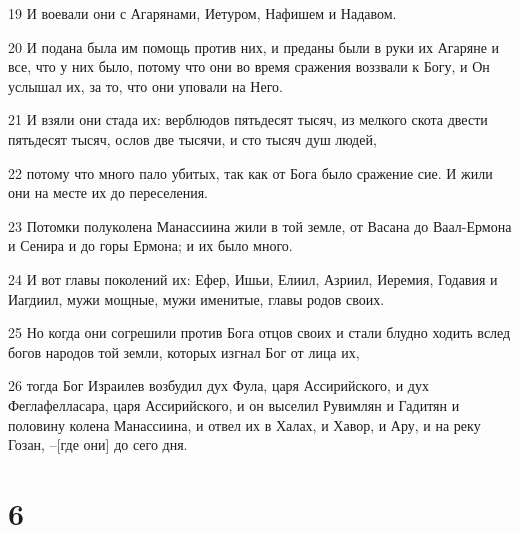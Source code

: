 \par 19 И воевали они с Агарянами, Иетуром, Нафишем и Надавом.
\par 20 И подана была им помощь против них, и преданы были в руки их Агаряне и все, что у них было, потому что они во время сражения воззвали к Богу, и Он услышал их, за то, что они уповали на Него.
\par 21 И взяли они стада их: верблюдов пятьдесят тысяч, из мелкого скота двести пятьдесят тысяч, ослов две тысячи, и сто тысяч душ людей,
\par 22 потому что много пало убитых, так как от Бога было сражение сие. И жили они на месте их до переселения.
\par 23 Потомки полуколена Манассиина жили в той земле, от Васана до Ваал-Ермона и Сенира и до горы Ермона; и их было много.
\par 24 И вот главы поколений их: Ефер, Ишьи, Елиил, Азриил, Иеремия, Годавия и Иагдиил, мужи мощные, мужи именитые, главы родов своих.
\par 25 Но когда они согрешили против Бога отцов своих и стали блудно ходить вслед богов народов той земли, которых изгнал Бог от лица их,
\par 26 тогда Бог Израилев возбудил дух Фула, царя Ассирийского, и дух Феглафелласара, царя Ассирийского, и он выселил Рувимлян и Гадитян и половину колена Манассиина, и отвел их в Халах, и Хавор, и Ару, и на реку Гозан, --[где они] до сего дня.

\chapter{6}

